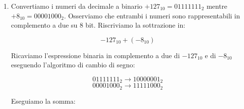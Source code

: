 \documentclass{article}
\begin{document}
\begin{enumerate}
\begin{center}
\end{center}

Il segno dei due addendi \`e concorde (somma di due negativi) ed anche il risultato della somma \`e negativo, di conseguenza  non vi \`e overflow. In alternativa possiamo applicare la regola dei riporti (ultimi due pi\`u significativi), che in questo caso sono concordi, ossia non vi \`e overflow. Per verificare l'esattezza del risultato convertiamolo in decimale (ci aspettiamo $-35_{10}-44_{10} = -79_{10}$)

$$-2^{7}+2^{5}+2^{4}+2^{0} = -128+32+16+1 = -128 + 49 = -79_{10}$$


\item Convertiamo i numeri da decimale a binario $+127_{10}=01111111_{2}$ mentre $+8_{10}=00001000_{2}$. Osserviamo che entrambi i numeri sono rappresentabili in complemento a due su 8 bit. Riscriviamo la sottrazione in:

$$-127_{10}+(-8_{10})$$

Ricaviamo l'espressione binaria in complemento a due di $-127_{10}$ e di $-8_{10}$ eseguendo l'algoritmo di cambio di segno:

$$ 01111111_{2} \rightarrow 10000001_{2}$$
$$ 00001000_{2} \rightarrow 11111000_{2}$$

Eseguiamo la somma:


\end{enumerate}
\end{document}
